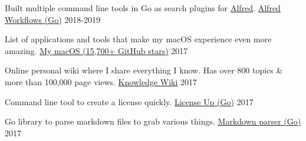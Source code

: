 
\begin{cventries}

  \cventry
    {Built multiple command line tools in Go as search plugins for \href{https://www.alfredapp.com}{Alfred}.}
    {\href{https://wiki.nikitavoloboev.xyz/sharing/my-github}{Alfred Workflows (Go)}}
    {}
    {2018-2019}
    {
    }

    \cventry
    {List of applications and tools that make my macOS experience even more amazing.}
    {\href{https://github.com/nikitavoloboev/my-mac-os}{My macOS (15,700+ GitHub stars)}}
    {}
    {2017}
    {
    }

    \cventry
    {Online personal wiki where I share everything I know. Has over 800 topics \& more than 100,000 page views.}
    {\href{https://wiki.nikitavoloboev.xyz}{Knowledge Wiki}}
    {}
    {2017}
    {
    }

    \cventry
    {Command line tool to create a license quickly.}
    {\href{https://github.com/nikitavoloboev/license-up}{License Up (Go)}}
    {}
    {2017}
    {
    }

    \cventry
    {Go library to parse markdown files to grab various things.}
    {\href{https://github.com/nikitavoloboev/markdown-parser}{Markdown parser (Go)}}
    {}
    {2017}
    {
    }

\end{cventries}
